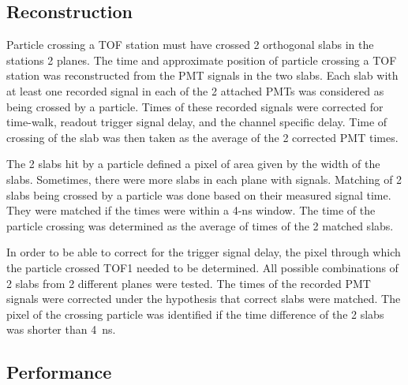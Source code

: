 \subsection{Reconstruction}

Particle crossing a TOF station must have crossed 2 orthogonal slabs
in the stations 2 planes.  The time and approximate position of
particle crossing a TOF station was reconstructed from the PMT signals
in the two slabs. Each slab with at least one recorded signal in each
of the 2 attached PMTs was considered as being crossed by a
particle. Times of these recorded signals were corrected for
time-walk, readout trigger signal delay, and the channel specific
delay. Time of crossing of the slab was then taken as the average of
the 2 corrected PMT times.

The 2 slabs hit by a particle defined a pixel of area given by the
width of the slabs. Sometimes, there were more slabs in each plane
with signals. Matching of 2 slabs being crossed by a particle was done
based on their measured signal time. They were matched if the times
were within a 4-ns window. The time of the particle crossing was
determined as the average of times of the 2 matched slabs.


In order to be able to correct for the trigger signal delay, the pixel
through which the particle crossed TOF1 needed to be determined. All
possible combinations of 2 slabs from 2 different planes were
tested. The times of the recorded PMT signals were corrected under the
hypothesis that correct slabs were matched. The pixel of the crossing
particle was identified if the time difference of the 2 slabs was
shorter than 4~ns.


\subsection{Performance}
\label{SubSect:TOF_Performance}




